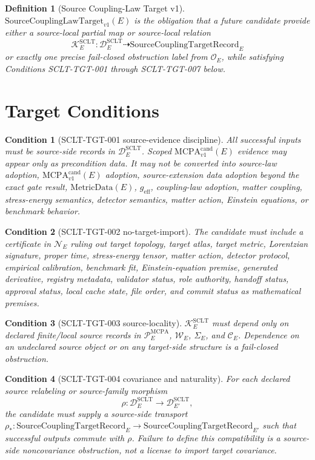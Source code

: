 \documentclass[11pt]{article}
\newcommand{\MetricData}{\mathrm{MetricData}}
\newcommand{\geff}{g_{\mathrm{eff}}}
\newcommand{\MCPA}{\mathrm{MCPA}^{\mathrm{cand}}_{v1}}
\newcommand{\SourceCoupTarget}{\mathrm{SourceCouplingLawTarget}_{v1}}
\newcommand{\SourceCoupRec}{\mathrm{SourceCouplingTargetRecord}}
\newtheorem{definition}{Definition}
\newtheorem{condition}{Condition}
\begin{document}
\begin{definition}[Source Coupling-Law Target v1]
\(\SourceCoupTarget(E)\) is the obligation that a future candidate provide
either a source-local partial map or source-local relation
\[
  \mathcal{K}^{\mathrm{SCLT}}_E:
  \mathcal{D}^{\mathrm{SCLT}}_E \dashrightarrow \SourceCoupRec_E
\]
or exactly one precise fail-closed obstruction label from \(\mathcal{O}_E\),
while satisfying Conditions SCLT-TGT-001 through SCLT-TGT-007 below.
\end{definition}

\section{Target Conditions}

\begin{condition}[SCLT-TGT-001 source-evidence discipline]
All successful inputs must be source-side records in
\(\mathcal{D}^{\mathrm{SCLT}}_E\). Scoped \(\MCPA(E)\) evidence may appear
only as precondition data. It may not be converted into source-law adoption,
\(\MCPA(E)\) adoption, source-extension data adoption beyond the exact gate
result, \(\MetricData(E)\), \(\geff\), coupling-law adoption, matter
coupling, stress-energy semantics, detector semantics, matter action,
Einstein equations, or benchmark behavior.
\end{condition}

\begin{condition}[SCLT-TGT-002 no-target-import]
The candidate must include a certificate in \(\mathcal{N}_E\) ruling out
target topology, target atlas, target metric, Lorentzian signature, proper
time, stress-energy tensor, matter action, detector protocol, empirical
calibration, benchmark fit, Einstein-equation premise, generated derivative,
registry metadata, validator status, role authority, handoff status,
approval status, local cache state, file order, and commit status as
mathematical premises.
\end{condition}

\begin{condition}[SCLT-TGT-003 source-locality]
\(\mathcal{K}^{\mathrm{SCLT}}_E\) must depend only on declared finite/local
source records in \(\mathcal{P}^{\mathrm{MCPA}}_E\), \(\mathcal{W}_E\),
\(\Sigma_E\), and \(\mathcal{C}_E\). Dependence on an undeclared source
object or on any target-side structure is a fail-closed obstruction.
\end{condition}

\begin{condition}[SCLT-TGT-004 covariance and naturality]
For each declared source relabeling or source-family morphism
\[
  \rho: \mathcal{D}^{\mathrm{SCLT}}_E \to
  \mathcal{D}^{\mathrm{SCLT}}_{E'},
\]
the candidate must supply a source-side transport
\(\rho_*:\SourceCoupRec_E\to \SourceCoupRec_{E'}\) such that successful
outputs commute with \(\rho\). Failure to define this compatibility is a
source-side noncovariance obstruction, not a license to import target
covariance.
\end{condition}
\end{document}
